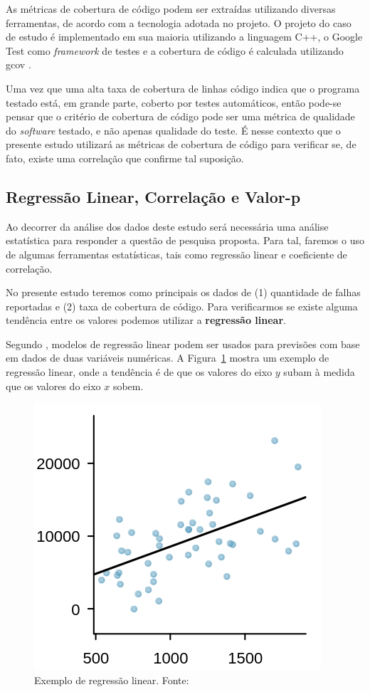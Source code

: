 \documentclass[11.5pt]{article}
\begin{document}
As métricas de cobertura de código podem ser extraídas utilizando diversas ferramentas, de acordo
com a tecnologia adotada no projeto.
O projeto do caso de estudo é implementado em sua maioria utilizando a linguagem C++, o
Google Test \cite{googleTest} como \textit{framework} de testes e
a cobertura de código é calculada utilizando gcov \cite{gcov}.

Uma vez que uma alta taxa de cobertura de linhas código indica que o programa testado está, em
grande parte, coberto por testes automáticos, então pode-se pensar que o critério de cobertura de
código pode ser uma métrica de qualidade do \textit{software} testado, e não apenas qualidade do
teste.
É nesse contexto que o presente estudo utilizará as métricas de cobertura de código para verificar
se, de fato, existe uma correlação que confirme tal suposição.


\subsection{Regressão Linear, Correlação e Valor-p}

Ao decorrer da análise dos dados deste estudo será necessária uma análise estatística para responder
a questão de pesquisa proposta.
Para tal, faremos o uso de algumas ferramentas estatísticas, tais como regressão linear e
coeficiente de correlação.

No presente estudo teremos como principais os dados de (1) quantidade de falhas reportadas e (2)
taxa de cobertura de código.
Para verificarmos se existe alguma tendência entre os valores podemos utilizar a
\textbf{regressão linear}.

Segundo \cite{openIntroStat}, modelos de regressão linear podem ser usados para previsões com base
em dados de duas variáveis numéricas. A Figura~\ref{fig:lin_reg_basic_example} mostra um exemplo de
regressão linear, onde a tendência é de que os valores do eixo $y$ subam à medida que os
valores do eixo $x$ sobem.

\begin{figure}[ht]
    \centering
    \includegraphics[width=.3\textwidth]{lin_reg_example.png}
    \caption{Exemplo de regressão linear. Fonte: \cite{openIntroStat}}
    \label{fig:lin_reg_basic_example}
\end{figure}
\end{document}

